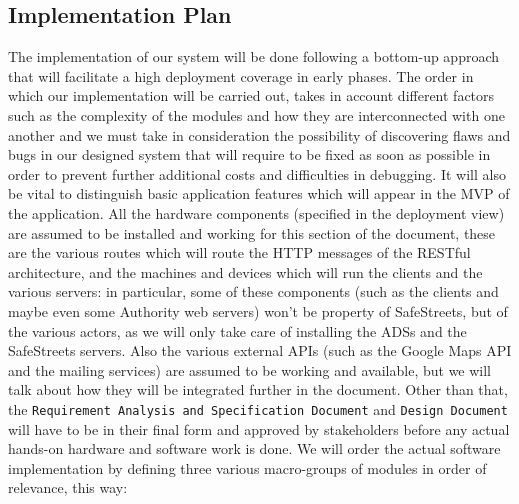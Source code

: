 \documentclass[12pt,a4paper]{article}
\begin{document}
		\subsection{Implementation Plan}
		The implementation of our system will be done following a bottom-up approach that will facilitate a high deployment coverage in early phases. The order in which our implementation will be carried out, takes in account different factors such as the complexity of the modules and how they are interconnected with one another and we must take in consideration the possibility of discovering flaws and bugs in our designed system that will require to be fixed as soon as possible in order to prevent further additional costs and difficulties in debugging. It will also be vital to distinguish basic application features which will appear in the MVP of the application. All the hardware components (specified in the deployment view) are assumed to be installed and working for this section of the document, these are the various routes which will route the HTTP messages of the RESTful architecture, and the machines and devices which will run the clients and the various servers: in particular, some of these components (such as the clients and maybe even some Authority web servers) won't be property of SafeStreets, but of the various actors, as we will only take care of installing the ADSs and the SafeStreets servers. Also the various external APIs (such as the Google Maps API and the mailing services) are assumed to be working and available, but we will talk about how they will be integrated further in the document.
Other than that, the \texttt{Requirement Analysis and Specification Document} and \texttt{Design Document} will have to be in their final form and approved by stakeholders before any actual hands-on hardware and software work is done.
		We will order the actual software implementation by defining three various macro-groups of modules in order of relevance, this way:
\end{document}
